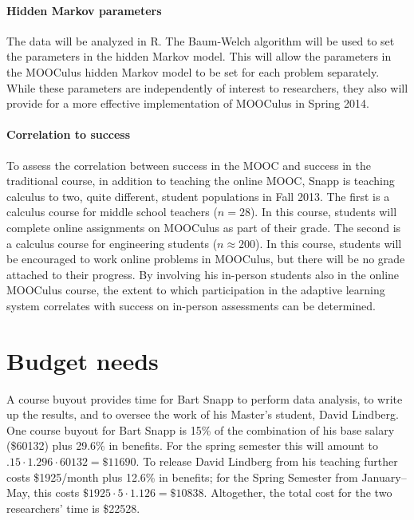 \documentclass[12pt]{article}
\begin{document}
\paragraph{Hidden Markov parameters}

The data will be analyzed in R. The Baum-Welch algorithm will be used
to set the parameters in the hidden Markov model. This will allow the
parameters in the MOOCulus hidden Markov model to be set for each
problem separately. While these parameters are independently of
interest to researchers, they also will provide for a more effective
implementation of MOOCulus in Spring 2014.

\paragraph{Correlation to success}

To assess the correlation between success in the MOOC and success in
the traditional course, in addition to teaching the online MOOC, Snapp
is teaching calculus to two, quite different, student populations in
Fall 2013.  The first is a calculus course for middle school teachers
($n=28$). In this course, students will complete online assignments on
MOOCulus as part of their grade.  The second is a calculus course for
engineering students ($n\approx 200$).  In this course, students will
be encouraged to work online problems in MOOCulus, but there will be
no grade attached to their progress.  By involving his in-person
students also in the online MOOCulus course, the extent to which
participation in the adaptive learning system correlates with success
on in-person assessments can be determined.




\section{Budget needs}
A course buyout provides time for Bart Snapp to perform data analysis,
to write up the results, and to oversee the work of his Master's
student, David Lindberg.  One course buyout for Bart Snapp is 15\% of
the combination of his base salary (\$60132) plus 29.6\% in
benefits. For the spring semester this will amount to $.15 \cdot
1.296\cdot 60132=\$11690$.  To release David Lindberg from his
teaching further costs \$1925/month plus 12.6\% in benefits; for the
Spring Semester from January--May, this costs $\$1925 \cdot 5 \cdot
1.126 = \$10838$.  Altogether, the total cost for the two researchers'
time is \$22528.

\pagebreak
\printbibliography
\end{document}
